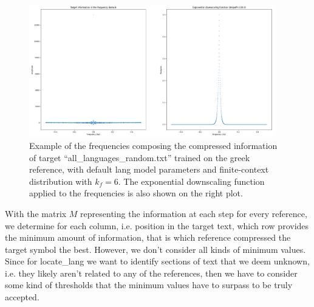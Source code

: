 \documentclass{article}
\begin{document}
\begin{figure}
    \centering
    \includegraphics[width=0.95\textwidth]{./images/low_pass_filter.png}
    \caption{Example of the frequencies composing the compressed information of target ``all_languages_random.txt'' trained on the greek reference, with default lang model parameters and finite-context distribution with $k_f=6$. The exponential downscaling function applied to the frequencies is also shown on the right plot.}
    \label{fig:low_pass_filter}
\end{figure}

With the matrix $M$ representing the information at each step for every reference, we determine for each column, i.e. position in the target text, which row provides the minimum amount of information, that is which reference compressed the target symbol the best.
However, we don't consider all kinds of minimum values.
Since for locate_lang we want to identify sections of text that we deem unknown, i.e. they likely aren't related to any of the references, then we have to consider some kind of thresholds that the minimum values have to surpass to be truly accepted.
\end{document}
